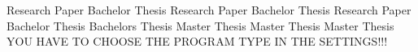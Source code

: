 \begin{center}

\vspace{1cm}

\begin{minipage}[t][5cm][s]{\textwidth}%
\centering
\Huge{{\color{FH2}{\fontsize{24}{30} \selectfont \workTitle\\}}}
\vspace{0.5cm}
\LARGE{{\color{FH2}{\fontsize{16}{24} \selectfont \subTitle\\}}}
\end{minipage}

\vspace{1cm}

\ifUseBachelorMediaTechnologiesOne
	\LARGE{Research Paper}
\else
	\ifUseBachelorMediaTechnologiesTwo
		\LARGE{Bachelor Thesis}
\else
\ifUseBachelorSmartEngineeringOne
	\LARGE{Research Paper}
\else
	\ifUseBachelorSmartEngineeringTwo
		\LARGE{Bachelor Thesis}
\else
\ifUseBachelorCreativeComputingOne
	\LARGE{Research Paper}
\else
	\ifUseBachelorCreativeComputingTwo
		\LARGE{Bachelor Thesis}
\else
	\ifUseMasterInteractiveTechnologies
		\LARGE{Bachelors Thesis}
\else
	\ifUseMasterDigitalDesign
		\LARGE{Master Thesis}
\else
    \ifUseMasterDigitalMediaProduction
		\LARGE{Master Thesis}
\else
	\ifUseMasterDigitalHealthCare
		\LARGE{Master Thesis}
    \else
        \LARGE{YOU HAVE TO CHOOSE THE PROGRAM TYPE IN THE SETTINGS!!!}
  	\fi
\fi
\fi
\fi\fi\fi\fi\fi\fi\fi
  

\end{center}
